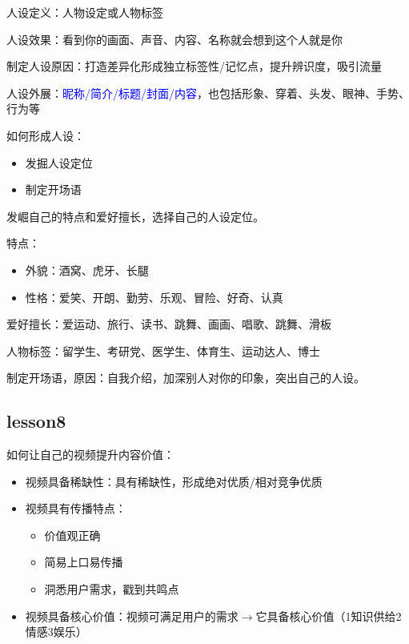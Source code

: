 \documentclass{book}
\begin{document}
人设定义：人物设定或人物标签

人设效果：看到你的画面、声音、内容、名称就会想到这个人就是你

制定人设原因：打造差异化形成独立标签性/记忆点，提升辨识度，吸引流量

人设外展：\textcolor{blue}{昵称/简介/标题/封面/内容}，也包括形象、穿着、头发、眼神、手势、行为等

如何形成人设：\begin{itemize}
         \item 发掘人设定位
         \item 制定开场语
       \end{itemize}

发崛自己的特点和爱好擅长，选择自己的人设定位。

特点：\begin{itemize}
     \item 外貌：酒窝、虎牙、长腿
     \item 性格：爱笑、开朗、勤劳、乐观、冒险、好奇、认真
   \end{itemize}

爱好擅长：爱运动、旅行、读书、跳舞、画画、唱歌、跳舞、滑板

人物标签：留学生、考研党、医学生、体育生、运动达人、博士

制定开场语，原因：自我介绍，加深别人对你的印象，突出自己的人设。

\subsection{lesson8}

如何让自己的视频提升内容价值：\begin{itemize}
                 \item 视频具备稀缺性：具有稀缺性，形成绝对优质/相对竞争优质
                 \item 视频具有传播特点：\begin{itemize}
                                  \item 价值观正确
                                  \item 简易上口易传播
                                  \item 洞悉用户需求，戳到共鸣点
                                \end{itemize}
                 \item 视频具备核心价值：视频可满足用户的需求$\rightarrow$它具备核心价值（1知识供给2情感3娱乐）
               \end{itemize}
\end{document}
